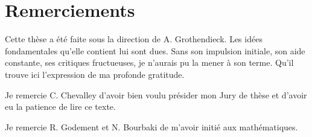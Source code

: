 \chapter*{Remerciements}

Cette thèse a été faite sous la direction de A. Grothendieck. Les idées
fondamentales qu'elle contient lui sont dues. Sans son impulsion initiale,
son aide constante, ses critiques fructueuses, je n'aurais pu la mener à son
terme. Qu'il trouve ici l'expression de ma profonde gratitude.

Je remercie C. Chevalley d'avoir bien voulu présider mon Jury de thèse et
d'avoir eu la patience de lire ce texte.

Je remercie R. Godement et N. Bourbaki de m'avoir initié aux mathématiques.

